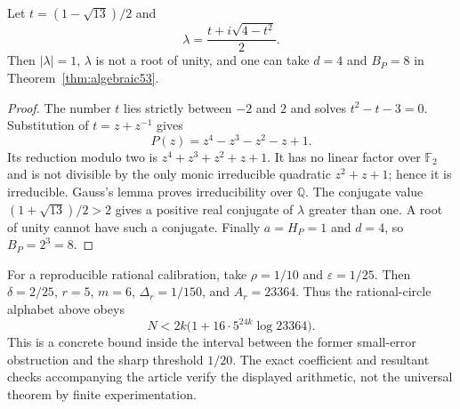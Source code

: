 \begin{proposition}\label{prop:salem53}
Let $t=(1-\sqrt{13})/2$ and
\[
 \lambda=\frac{t+i\sqrt{4-t^2}}2.
\]
Then $|\lambda|=1$, $\lambda$ is not a root of unity, and one can take $d=4$ and $B_P=8$ in Theorem~\ref{thm:algebraic53}.
\end{proposition}
\begin{proof}
The number $t$ lies strictly between $-2$ and $2$ and solves $t^2-t-3=0$. Substitution of $t=z+z^{-1}$ gives
\[
                       P(z)=z^4-z^3-z^2-z+1.
\]
Its reduction modulo two is $z^4+z^3+z^2+z+1$. It has no linear factor over $\mathbb F_2$ and is not divisible by the only monic irreducible quadratic $z^2+z+1$; hence it is irreducible. Gauss's lemma proves irreducibility over $\mathbb Q$. The conjugate value $(1+\sqrt{13})/2>2$ gives a positive real conjugate of $\lambda$ greater than one. A root of unity cannot have such a conjugate. Finally $a=H_P=1$ and $d=4$, so $B_P=2^3=8$.
\end{proof}
For a reproducible rational calibration, take $\rho=1/10$ and $\varepsilon=1/25$. Then $\delta=2/25$, $r=5$, $m=6$, $\Delta_r=1/150$, and $A_r=23364$. Thus the rational-circle alphabet above obeys
\[
                 N<2k\bigl(1+16\cdot5^{24k}\log23364\bigr).
\]
This is a concrete bound inside the interval between the former small-error obstruction and the sharp threshold $1/20$. The exact coefficient and resultant checks accompanying the article verify the displayed arithmetic, not the universal theorem by finite experimentation.

